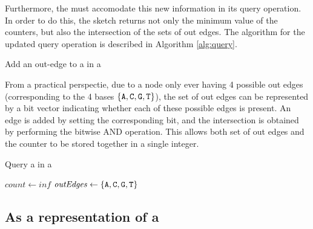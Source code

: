 Furthermore, the \dBCM must accomodate this new information in its query operation. In order to do this, the sketch returns not only
the minimum value of the counters, but also the intersection of the sets of out edges. The algorithm for the updated query operation is
described in Algorithm \ref{alg:query}.

\begin{algorithm}[htbp]
    \caption{Add an out-edge to a \kmer in a \dBCM}\label{alg:addOutEdge}
\end{algorithm}

From a practical perspectie, due to a node only ever having 4 possible out edges (corresponding to the 4 bases $\{\mathtt{A}, \mathtt{C}, \mathtt{G}, \mathtt{T}\}$),
the set of out edges can be represented by a bit vector indicating whether each of these possible edges is present. An edge is added
by setting the corresponding bit, and the intersection is obtained by performing the bitwise AND operation. This allows both set of
out edges and the counter to be stored together in a single integer.  

\begin{algorithm}
    \caption{Query a \kmer in a \dBCM}\label{alg:query}
    $\mathit{count} \gets \mathit{inf}$\;
    $\mathit{outEdges} \gets \{\mathtt{A}, \mathtt{C}, \mathtt{G}, \mathtt{T}\}$\;
\end{algorithm}

\subsection{As a representation of a \dBG}

